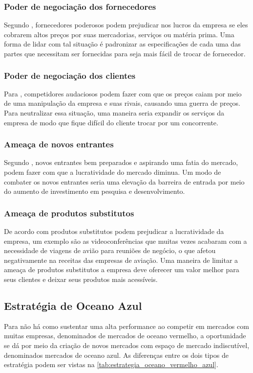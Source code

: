 \subsubsection{Poder de negociação dos fornecedores}
\label{poder_fornecedores}
Segundo , fornecedores poderosos podem prejudicar nos lucros da empresa se eles cobrarem altos preços por suas mercadorias, serviços ou matéria prima. Uma forma de lidar com tal situação é padronizar as especificações de cada uma das partes que necessitam ser fornecidas para seja mais fácil de trocar de fornecedor.

\subsubsection{Poder de negociação dos clientes}
\label{poder_clientes}
Para , competidores audaciosos podem fazer com que os preços caiam por meio de uma manipulação da empresa e suas rivais, causando uma guerra de preços. Para neutralizar essa situação, uma maneira seria expandir os serviços da empresa de modo que fique difícil do cliente trocar por um concorrente.

\subsubsection{Ameaça de novos entrantes}
\label{ameaça_entrantes}
Segundo , novos entrantes bem preparados e aspirando uma fatia do mercado, podem fazer com que a lucratividade do mercado diminua. Um modo de combater os novos entrantes seria uma elevação da barreira de entrada por meio do aumento de investimento em pesquisa e desenvolvimento.

\subsubsection{Ameaça de produtos substitutos}
\label{ameaça_substitutos}
De acordo com  produtos substitutos podem prejudicar a lucratividade da empresa, um exemplo são as videoconferências que muitas vezes acabaram com a necessidade de viagens de avião para reuniões de negócio, o que afetou negativamente na receitas das empresas de aviação. Uma maneira de limitar a ameaça de produtos substitutos a empresa deve oferecer um valor melhor para seus clientes e deixar seus produtos mais acessíveis.

\subsection{Estratégia de Oceano Azul}
\label{oceano_azul}
Para  não há como sustentar uma alta performance ao competir em mercados com muitas empresas, denominados de mercados de oceano vermelho, a oportunidade se dá por meio da criação de novos mercados com espaço de mercado indiscutível, denominados mercados de oceano azul. As diferenças entre os dois tipos de estratégia podem ser vistas na \autoref{tab:estrategia_oceano_vermelho_azul}.

